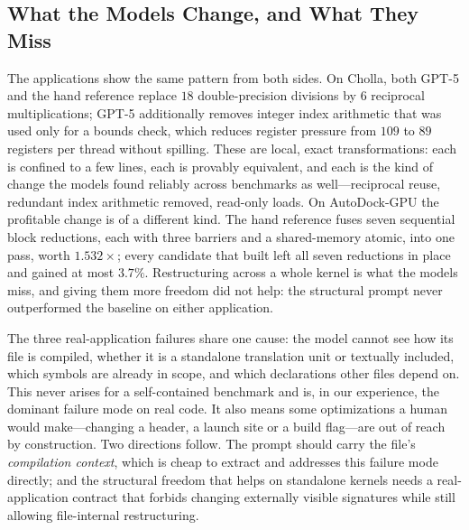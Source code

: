 \subsection{What the Models Change, and What They Miss}
\label{sec:whatmodels}
The applications show the same pattern from both sides. On Cholla, both GPT-5 and the hand reference
replace $18$ double-precision divisions by $6$ reciprocal multiplications; GPT-5 additionally removes
integer index arithmetic that was used only for a bounds check, which reduces register pressure from
$109$ to $89$ registers per thread without spilling.
These are local, exact transformations: each is confined to a few lines, each is provably equivalent,
and each is the kind of change the models found reliably across benchmarks as well---reciprocal
reuse, redundant index arithmetic removed, read-only loads. On AutoDock-GPU the profitable change is
of a different kind. The hand reference fuses seven sequential block reductions, each with three
barriers and a shared-memory atomic, into one pass, worth $1.532\times$; every candidate that built
left all seven reductions in place and gained at most $3.7\%$. Restructuring across a whole kernel is
what the models miss, and giving them more freedom did not help: the structural prompt never
outperformed the baseline on either application.

The three real-application failures share one cause: the model cannot see how its file is compiled,
whether it is a standalone translation unit or textually included, which symbols are already in scope,
and which declarations other files depend on. This never arises for a self-contained benchmark and
is, in our experience, the dominant failure mode on real code. It also means some optimizations a human
would make---changing a header, a launch site or a build flag---are out of reach by construction. Two
directions follow. The prompt should carry the file's \emph{compilation context}, which is cheap to
extract and addresses this failure mode directly; and the structural freedom that helps on standalone
kernels needs a real-application contract that forbids changing externally visible signatures while
still allowing file-internal restructuring.

